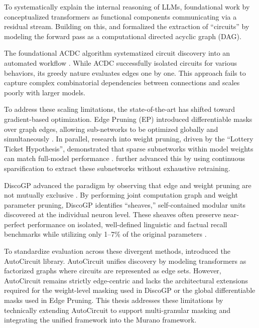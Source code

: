 \documentclass[
    IMRAD=false,
	english,
	ruledheaders=section, %
	class=report, %
	thesis={type=bachelor}, %
	accentcolor=9c, %
	custommargins=false,%
	marginpar=false,%
	parskip=half,%
	fontsize=11pt,%
]{tudapub}
\begin{document}
To systematically explain the internal reasoning of LLMs, foundational work by \citet{elhage2021mathematical} conceptualized transformers as functional components communicating via a residual stream. Building on this, \citet{wang2023interpretability} and \citet{acdc} formalized the extraction of ``circuits'' by modeling the forward pass as a computational directed acyclic graph (DAG).

The foundational ACDC algorithm systematized circuit discovery into an automated workflow \citep{acdc}. While ACDC successfully isolated circuits for various behaviors, its greedy nature evaluates edges one by one. This approach fails to capture complex combinatorial dependencies between connections and scales poorly with larger models.

To address these scaling limitations, the state-of-the-art has shifted toward gradient-based optimization. Edge Pruning (EP) introduced differentiable masks over graph edges, allowing sub-networks to be optimized globally and simultaneously \citep{edgePruning}. In parallel, research into weight pruning, driven by the ``Lottery Ticket Hypothesis'', demonstrated that sparse subnetworks within model weights can match full-model performance \citep{frankle2019lottery}. \citet{savarese2021winninglotterycontinuous} further advanced this by using continuous sparsification to extract these subnetworks without exhaustive retraining.

DiscoGP advanced the paradigm by observing that edge and weight pruning are not mutually exclusive \citep{yu-etal-2025-sheaf}. By performing joint computation graph and weight parameter pruning, DiscoGP identifies ``sheaves,'' self-contained modular units discovered at the individual neuron level. These sheaves often preserve near-perfect performance on isolated, well-defined linguistic and factual recall benchmarks while utilizing only 1–7\% of the original parameters \citep{yu-etal-2025-sheaf}.

To standardize evaluation across these divergent methods, \citet{miller2024transformer} introduced the AutoCircuit library. AutoCircuit unifies discovery by modeling transformers as factorized graphs where circuits are represented as edge sets. However, AutoCircuit remains strictly edge-centric and lacks the architectural extensions required for the weight-level masking used in DiscoGP or the global differentiable masks used in Edge Pruning. This thesis addresses these limitations by technically extending AutoCircuit to support multi-granular masking and integrating the unified framework into the Murano framework.
\end{document}
